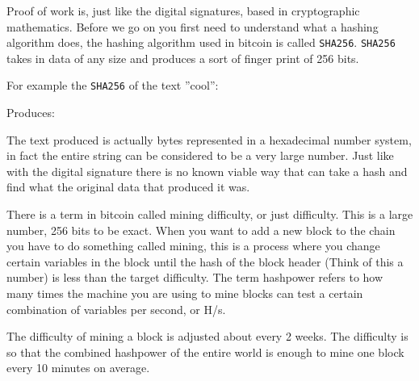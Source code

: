 Proof of work is, just like the digital signatures, based in cryptographic mathematics. Before we go on you first need to understand what a hashing algorithm does, the hashing algorithm used in bitcoin is called \texttt{SHA256}. \texttt{SHA256} takes in data of any size and produces a sort of finger print of 256 bits. 

For example the \texttt{SHA256} of the text ''cool'': 


Produces: 


The text produced is actually bytes represented in a hexadecimal number system, in fact the entire string can be considered to be a very large number. Just like with the digital signature there is no known viable way that can take a hash and find what the original data that produced it was. 

There is a term in bitcoin called mining difficulty, or just difficulty. This is a large number, 256 bits to be exact. When you want to add a new block to the chain you have to do something called mining, this is a process where you change certain variables in the block until the hash of the block header (Think of this a number) is less than the target difficulty. The term hashpower refers to how many times the machine you are using to mine blocks can test a certain combination of variables per second, or H/s.

The difficulty of mining a block is adjusted about every 2 weeks. The difficulty is so that the combined hashpower of the entire world is enough to mine one block every 10 minutes on average. 





